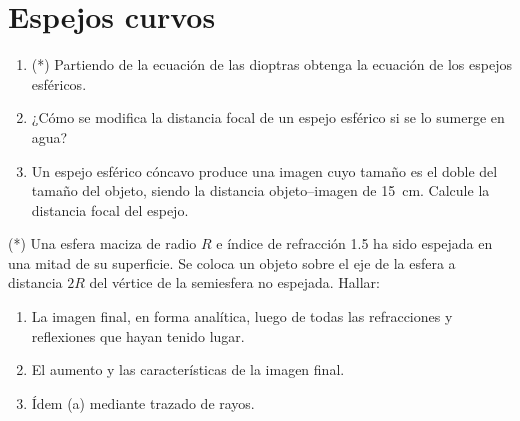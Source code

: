 \section*{Espejos curvos}

\item
\begin{enumerate}
	\item (*) Partiendo de la ecuación de las dioptras obtenga la ecuación de los espejos esféricos. 
	\item ¿Cómo se modifica la distancia focal de un espejo esférico si se lo sumerge en agua?
	\item Un espejo esférico cóncavo produce una imagen cuyo tamaño es el doble del tamaño del objeto, siendo la distancia objeto--imagen de \SI{15}{\centi\metre}.
	Calcule la distancia focal del espejo.
\end{enumerate}



\item (*) Una esfera maciza de radio $R$ e índice de refracción \num{1.5} ha sido espejada en una mitad de su superficie.
Se coloca un objeto sobre el eje de la esfera a distancia $2R$ del vértice de la semiesfera no espejada.
Hallar:
\begin{enumerate}
\item La imagen final, en forma analítica, luego de todas las refracciones
y reflexiones que hayan tenido lugar.
\item El aumento y las características de la imagen final.
\item Ídem (a) mediante trazado de rayos.
\end{enumerate}
